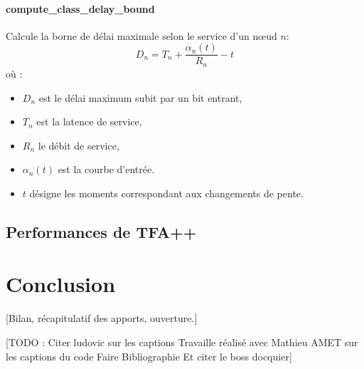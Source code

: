 \documentclass[12pt]{report}
\begin{document}
\subsubsection*{compute\_class\_delay\_bound}

Calcule la borne de délai maximale selon le service d'un nœud $n$:
\[
D_n = T_n + \frac{\alpha_n(t)}{R_n} - t
\]
où :
\begin{itemize}
  \item $D_n$ est le délai maximum subit par un bit entrant,
  \item $T_n$ est la latence de service,
  \item $R_n$ le débit de service,
  \item $\alpha_n(t)$ est la courbe d'entrée.
  \item $t$ désigne les moments correspondant aux changements de pente.
\end{itemize}


\section{Performances de TFA++}




\chapter{Conclusion}
[Bilan, récapitulatif des apports, ouverture.]

[TODO : Citer ludovic sur les captions
        Travaille réalisé avec Mathieu AMET sur les captions du code
        Faire Bibliographie
        Et citer le boss docquier]

\end{document}
